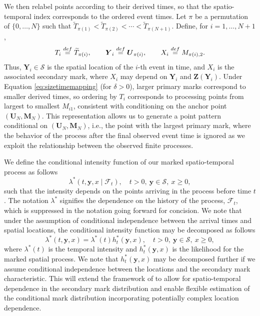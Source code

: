 {We then relabel points according to their derived times, so that the spatio-temporal index corresponds to the ordered event times.
Let \(\pi\) be a permutation of \(\{0,\dots,N\}\) such that
\(\widetilde{T}_{\pi(1)} < \widetilde{T}_{\pi(2)} < \cdots < \widetilde{T}_{\pi(N+1)}\).
Define, for \(i = 1,\dots,N+1\),
\[
T_i \stackrel{\tiny def}{=}\widetilde{T}_{\pi(i)}, \qquad \boldsymbol{Y}_i \stackrel{\tiny def}{=}\boldsymbol{U}_{\pi(i)}, \qquad X_i \stackrel{\tiny def}{=}M_{\pi(i),2}.
\]
Thus, \(\boldsymbol{Y}_i \in \mathscr{S}\) is the spatial location of the \(i\)-th event in time, and \(X_i\) is the associated secondary mark, where \(X_i\) may depend on \(\boldsymbol{Y}_i\) and \(\boldsymbol{Z}(\boldsymbol{Y}_i)\).
Under Equation \eqref{eq:sizetimemapping} (for \(\delta > 0\)), larger primary marks correspond to smaller derived times, so ordering by \(T_i\) corresponds to processing points from largest to smallest \(M_{i1}\), consistent with conditioning on the anchor point \((\boldsymbol{U}_N, \boldsymbol{M}_N)\). This representation allows us to generate a point pattern conditional on \((\boldsymbol{U}_N, \boldsymbol{M}_N)\), i.e., the point with the largest primary mark, where the behavior of the process after the final observed event time is ignored as we exploit the relationship between the observed finite processes.}

We define the conditional intensity function of our marked
spatio-temporal process as follows \[
\lambda^*(t, \boldsymbol{y}, x \mid \mathscr{F}_t), \quad t > 0, \ \boldsymbol{y} \in \mathscr{S}, \ x \geq 0,
\] such that the intensity depends on the points arriving in the process
before time \(t\). The notation \(\lambda^*\) signifies the dependence on
the history of the process, \(\mathscr{F}_t\), which is suppressed in the
notation going forward for concision. We note that under the assumption
of conditional independence between the arrival times and spatial
locations, the conditional intensity function may be decomposed as
follows \[
\lambda^*(t, \boldsymbol{y}, x) = \lambda^*(t) h_t^*(\boldsymbol{y}, x),\quad t > 0, \ \boldsymbol{y} \in \mathscr{S}, \ x \geq 0,
\] where \(\lambda^*(t)\) is the temporal intensity and
\(h_t^*(\boldsymbol{y}, x)\) is the likelihood for the marked spatial
process. We note that \(h_t^*(\boldsymbol{y}, x)\) may be decomposed
further if we assume conditional independence between the locations and
the secondary mark characteristic. This will extend the framework of
\citet{mollerMechanisticSpatiotemporalPoint2016a} to allow for spatio-temporal
dependence in the secondary mark distribution and enable flexible
estimation of the conditional mark distribution incorporating
potentially complex location dependence.

